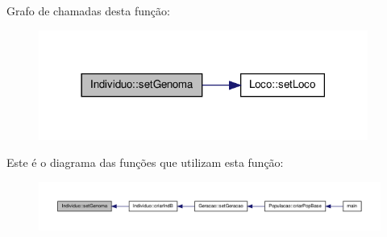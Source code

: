 \-Grafo de chamadas desta função\-:\nopagebreak
\begin{figure}[H]
\begin{center}
\leavevmode
\includegraphics[width=306pt]{class_individuo_a1641427ff59310a53fc0076e519102c6_cgraph}
\end{center}
\end{figure}




\-Este é o diagrama das funções que utilizam esta função\-:\nopagebreak
\begin{figure}[H]
\begin{center}
\leavevmode
\includegraphics[width=350pt]{class_individuo_a1641427ff59310a53fc0076e519102c6_icgraph}
\end{center}
\end{figure}


